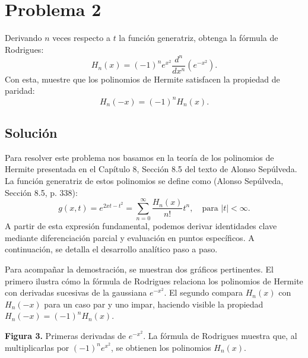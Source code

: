 \documentclass[a4paper]{article}
\begin{document}
\section{Problema 2}
Derivando $n$ veces respecto a $t$ la función generatriz, obtenga la fórmula de Rodrigues:
$$
H_n(x) = (-1)^n e^{x^2} \frac{d^n}{dx^n} \left( e^{-x^2} \right).
$$
Con esta, muestre que los polinomios de Hermite satisfacen la propiedad de paridad:
$$
H_n(-x) = (-1)^n H_n(x).
$$

\subsection{Solución}
Para resolver este problema nos basamos en la teoría de los polinomios de Hermite presentada en el Capítulo 8, Sección 8.5 del texto de Alonso Sepúlveda. La función generatriz de estos polinomios se define como (Alonso Sepúlveda, Sección 8.5, p. 338):
$$
g(x, t) = e^{2xt - t^2} = \sum_{n=0}^{\infty} \frac{H_n(x)}{n!} t^n, \quad \text{para } |t| < \infty.
$$
A partir de esta expresión fundamental, podemos derivar identidades clave mediante diferenciación parcial y evaluación en puntos específicos. A continuación, se detalla el desarrollo analítico paso a paso.

Para acompañar la demostración, se muestran dos gráficos pertinentes. El primero ilustra cómo la fórmula de Rodrigues relaciona los polinomios de Hermite con derivadas sucesivas de la gaussiana $e^{-x^2}$. El segundo compara $H_n(x)$ con $H_n(-x)$ para un caso par y uno impar, haciendo visible la propiedad $H_n(-x)=(-1)^nH_n(x)$.

\begin{center}

\small\textbf{Figura 3.} Primeras derivadas de $e^{-x^2}$. La fórmula de Rodrigues muestra que, al multiplicarlas por $(-1)^n e^{x^2}$, se obtienen los polinomios $H_n(x)$.
\end{center}
\end{document}
